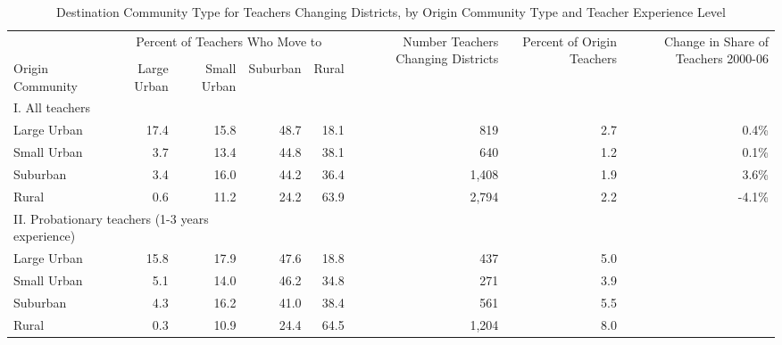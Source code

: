\begin{sidewaystable}[htbp]
\centering
\begin{tabular}{lrrrrrrr}
  \hline
 & \multicolumn{4}{c}{\multirow{2}{*}{Percent of Teachers Who Move to}} & \multirow{4}{*}{\parbox{0.09\linewidth}{Number Teachers Changing Districts}} & \multirow{4}{*}{\parbox{0.07\linewidth}{Percent of Origin Teachers}} & \multirow{4}{*}{\parbox{0.09\linewidth}{Change in Share of Teachers 2000-06}}\\
 & \multicolumn{4}{c}{} & & & \\ \cline{2-5}
& & & & & & & \\
Origin Community & Large Urban & Small Urban & Suburban & Rural &  &  &  \\ 
  \hline
I. All teachers & & & & & & & \\
\quad Large Urban & 17.4 & 15.8 & 48.7 & 18.1 & 819 & 2.7 & 0.4\% \\ 
  \quad Small Urban & 3.7 & 13.4 & 44.8 & 38.1 & 640 & 1.2 & 0.1\% \\ 
  \quad Suburban & 3.4 & 16.0 & 44.2 & 36.4 & 1,408 & 1.9 & 3.6\% \\ 
  \quad Rural & 0.6 & 11.2 & 24.2 & 63.9 & 2,794 & 2.2 & -4.1\% \\ 
\multicolumn{3}{l}{II. Probationary teachers (1-3 years experience)} & & & & & \\
  \quad Large Urban & 15.8 & 17.9 & 47.6 & 18.8 & 437 & 5.0 &  \\ 
  \quad Small Urban & 5.1 & 14.0 & 46.2 & 34.8 & 271 & 3.9 &  \\ 
  \quad Suburban & 4.3 & 16.2 & 41.0 & 38.4 & 561 & 5.5 &  \\ 
  \quad Rural & 0.3 & 10.9 & 24.4 & 64.5 & 1,204 & 8.0 &  \\ 
   \hline
\end{tabular}
\caption{Destination Community Type for Teachers Changing Districts, by Origin Community Type and Teacher Experience Level} 
\label{tbl:markov}
\end{sidewaystable}

